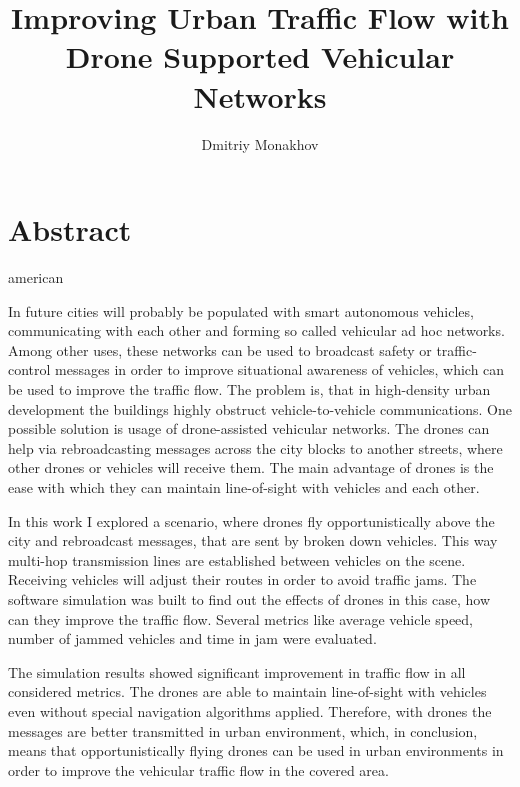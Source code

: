 \documentclass[]{nsm-thesis}
\author{Dmitriy Monakhov}
\title{Improving Urban Traffic Flow with Drone Supported Vehicular Networks}
\begin{document}

\maketitle

\cleardoublepage


\chapter*{Abstract}
\begin{otherlanguage*}{american}

In future cities will probably be populated with smart autonomous vehicles, communicating with each other and forming so called vehicular ad hoc networks. Among other uses, these networks can be used to broadcast safety or traffic-control messages in order to improve situational awareness of vehicles, which can be used to improve the traffic flow. The problem is, that in high-density urban development the buildings highly obstruct vehicle-to-vehicle communications. One possible solution is usage of drone-assisted vehicular networks. The drones can help via rebroadcasting messages across the city blocks to another streets, where other drones or vehicles will receive them. The main advantage of drones is the ease with which they can maintain line-of-sight with vehicles and each other.

In this work I explored a scenario, where drones fly opportunistically above the city and rebroadcast messages, that are sent by broken down vehicles. This way multi-hop transmission lines are established between vehicles on the scene. Receiving vehicles will adjust their routes in order to avoid traffic jams. The software simulation was built to find out the effects of drones in this case, how can they improve the traffic flow. Several metrics like average vehicle speed, number of jammed vehicles and time in jam were evaluated.

The simulation results showed significant improvement in traffic flow in all considered metrics. The drones are able to maintain line-of-sight with vehicles even without special navigation algorithms applied. Therefore, with drones the messages are better transmitted in urban environment, which, in conclusion, means that opportunistically flying drones can be used in urban environments in order to improve the vehicular traffic flow in the covered area.

\end{otherlanguage*}
\end{document}

